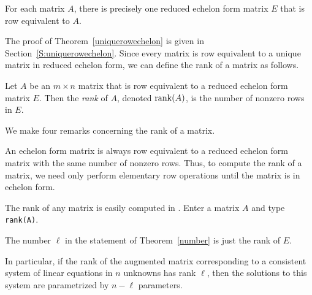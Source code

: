 \documentclass{ximera}
\begin{document}
\begin{theorem} \label{uniquerowechelon}
For each matrix $A$, there is precisely one reduced echelon form
matrix $E$ that is row equivalent  to $A$.
\end{theorem}

The proof of Theorem~\ref{uniquerowechelon} is given in 
Section~\ref{S:uniquerowechelon}.  Since every matrix is row equivalent 
to a unique matrix in reduced echelon form, we can define the rank 
of a matrix as follows.
\begin{definition}  \label{D:rank}
Let $A$ be an $m\times n$ matrix that is row equivalent to a
reduced echelon form matrix $E$.  Then the {\em rank\/} of $A$,
denoted ${\rm rank}(A)$, is the number of nonzero rows in $E$.
\end{definition}  

\begin{corollary} \label{C:rank_solutions}
We make four remarks concerning the rank of a matrix.
\begin{enumeratea}
\item An echelon form matrix is always row equivalent to a
reduced echelon form matrix with the same number of nonzero
rows.  Thus, to compute the rank of a matrix, we need only
perform elementary row operations until the matrix is in echelon
form.
\item	The rank of any matrix is easily computed in \Matlabp.
Enter a matrix $A$ and type {\tt rank(A)}.
\item The number $\ell$ in the statement of Theorem~\ref{number}
is just the rank of $E$.
\item  \label{C:rank_solutions_d} In particular, if the rank of the augmented matrix corresponding to
a consistent system of linear equations in $n$ unknowns has rank $\ell$,
then the solutions to this system are parametrized by $n-\ell$ parameters.
\end{enumeratea}
\end{corollary}


\end{document}
